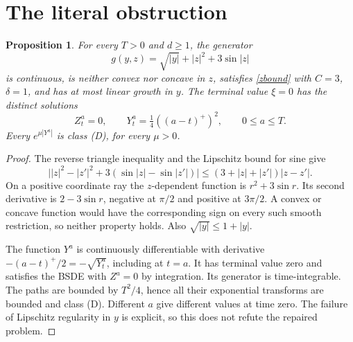 \documentclass[11pt]{article}
\newtheorem{proposition}[theorem]{Proposition}
\begin{document}
\section{The literal obstruction}
\begin{proposition}
For every $T>0$ and $d\geq1$, the generator
\[
 g(y,z)=\sqrt{|y|}+|z|^2+3\sin|z|
\]
is continuous, is neither convex nor concave in $z$, satisfies
\eqref{zbound} with $C=3$, $\delta=1$, and has at most linear growth
in $y$. The terminal value $\xi=0$ has the distinct solutions
\[
 Z^a_t=0,\qquad Y^a_t=\tfrac14((a-t)^+)^2,\qquad 0\leq a\leq T.
\]
Every $e^{\mu|Y^a|}$ is class (D), for every $\mu>0$.
\end{proposition}
\begin{proof}
The reverse triangle inequality and the Lipschitz bound for sine give
\[
 \bigl||z|^2-|z'|^2+3(\sin|z|-\sin|z'|)\bigr|
 \leq(3+|z|+|z'|)|z-z'|.
\]
On a positive coordinate ray the $z$-dependent function is $r^2+3\sin r$.
Its second derivative is $2-3\sin r$, negative at $\pi/2$ and positive
at $3\pi/2$. A convex or concave function would have the corresponding
sign on every such smooth restriction, so neither property holds.
Also $\sqrt{|y|}\leq1+|y|$.

The function $Y^a$ is continuously differentiable with derivative
$-(a-t)^+/2=-\sqrt{Y^a_t}$, including at $t=a$.
It has terminal value zero and satisfies the BSDE with $Z^a=0$ by
integration. Its generator is time-integrable. The paths are bounded by
$T^2/4$, hence all their exponential transforms are bounded and class (D).
Different $a$ give different values at time zero. The failure of Lipschitz
regularity in $y$ is explicit, so this does not refute the repaired problem.
\end{proof}
\end{document}
